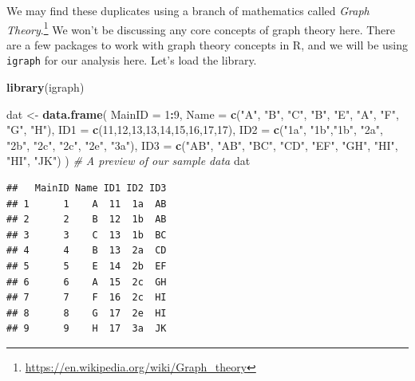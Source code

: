 \documentclass[
]{book}
\newenvironment{Shaded}{\begin{snugshade}}{\end{snugshade}}
\newcommand{\AttributeTok}[1]{\textcolor[rgb]{0.13,0.29,0.53}{#1}}
\newcommand{\CommentTok}[1]{\textcolor[rgb]{0.56,0.35,0.01}{\textit{#1}}}
\newcommand{\DecValTok}[1]{\textcolor[rgb]{0.00,0.00,0.81}{#1}}
\newcommand{\FunctionTok}[1]{\textcolor[rgb]{0.13,0.29,0.53}{\textbf{#1}}}
\newcommand{\NormalTok}[1]{#1}
\newcommand{\OtherTok}[1]{\textcolor[rgb]{0.56,0.35,0.01}{#1}}
\newcommand{\SpecialCharTok}[1]{\textcolor[rgb]{0.81,0.36,0.00}{\textbf{#1}}}
\newcommand{\StringTok}[1]{\textcolor[rgb]{0.31,0.60,0.02}{#1}}
\begin{document}
We may find these duplicates using a branch of mathematics called \emph{Graph Theory}.\footnote{\url{https://en.wikipedia.org/wiki/Graph_theory}} We won't be discussing any core concepts of graph theory here. There are a few packages to work with graph theory concepts in R, and we will be using \texttt{igraph} \citep{R-igraph} for our analysis here. Let's load the library.

\begin{Shaded}
\begin{Highlighting}[]
\FunctionTok{library}\NormalTok{(igraph)}
\end{Highlighting}
\end{Shaded}

\begin{Shaded}
\begin{Highlighting}[]
\NormalTok{dat }\OtherTok{\textless{}{-}} \FunctionTok{data.frame}\NormalTok{(}
  \AttributeTok{MainID =} \DecValTok{1}\SpecialCharTok{:}\DecValTok{9}\NormalTok{,}
  \AttributeTok{Name =} \FunctionTok{c}\NormalTok{(}\StringTok{"A"}\NormalTok{, }\StringTok{"B"}\NormalTok{, }\StringTok{"C"}\NormalTok{, }\StringTok{"B"}\NormalTok{, }\StringTok{"E"}\NormalTok{, }\StringTok{"A"}\NormalTok{, }\StringTok{"F"}\NormalTok{, }\StringTok{"G"}\NormalTok{, }\StringTok{"H"}\NormalTok{),}
  \AttributeTok{ID1 =} \FunctionTok{c}\NormalTok{(}\DecValTok{11}\NormalTok{,}\DecValTok{12}\NormalTok{,}\DecValTok{13}\NormalTok{,}\DecValTok{13}\NormalTok{,}\DecValTok{14}\NormalTok{,}\DecValTok{15}\NormalTok{,}\DecValTok{16}\NormalTok{,}\DecValTok{17}\NormalTok{,}\DecValTok{17}\NormalTok{),}
  \AttributeTok{ID2 =} \FunctionTok{c}\NormalTok{(}\StringTok{"1a"}\NormalTok{, }\StringTok{"1b"}\NormalTok{,}\StringTok{"1b"}\NormalTok{, }\StringTok{"2a"}\NormalTok{, }\StringTok{"2b"}\NormalTok{, }\StringTok{"2c"}\NormalTok{, }\StringTok{"2c"}\NormalTok{, }\StringTok{"2e"}\NormalTok{, }\StringTok{"3a"}\NormalTok{),}
  \AttributeTok{ID3 =} \FunctionTok{c}\NormalTok{(}\StringTok{"AB"}\NormalTok{, }\StringTok{"AB"}\NormalTok{, }\StringTok{"BC"}\NormalTok{, }\StringTok{"CD"}\NormalTok{, }\StringTok{"EF"}\NormalTok{, }\StringTok{"GH"}\NormalTok{, }\StringTok{"HI"}\NormalTok{, }\StringTok{"HI"}\NormalTok{, }\StringTok{"JK"}\NormalTok{)}
\NormalTok{)}
\CommentTok{\# A preview of our sample data}
\NormalTok{dat}
\end{Highlighting}
\end{Shaded}

\begin{verbatim}
##   MainID Name ID1 ID2 ID3
## 1      1    A  11  1a  AB
## 2      2    B  12  1b  AB
## 3      3    C  13  1b  BC
## 4      4    B  13  2a  CD
## 5      5    E  14  2b  EF
## 6      6    A  15  2c  GH
## 7      7    F  16  2c  HI
## 8      8    G  17  2e  HI
## 9      9    H  17  3a  JK
\end{verbatim}
\end{document}
